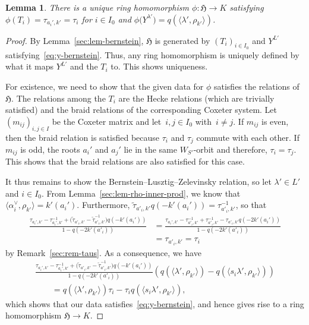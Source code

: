 \documentclass[pdftex]{sigma}
\newtheorem{Lemma}[Theorem]{Lemma}
\theoremstyle{definition}
\numberwithin{equation}{section}
\begin{document}
\begin{Lemma}\label{sec:lem-trivial-character}
 There is a unique ring homomorphism $\phi\colon \mathfrak{H}\to K$ satisfying
 $\phi(T_i) = \tau_{a_i',k'}=\tau_i$ for $i\in I_0$ and
$
 \phi\bigl(Y^{\lambda'}\bigr) = q(\langle \lambda', \rho_{k'}\rangle)$.
\end{Lemma}
\begin{proof}
 By Lemma~\ref{sec:lem-bernstein}, $\mathfrak{H}$ is generated by $(T_i)_{i\in I_0}$ and $Y^{L'}$ satisfying~\eqref{eq:y-bernstein}.
 Thus, any ring homomorphism is uniquely defined by what it maps $Y^{L'}$ and the $T_i$ to. This shows uniqueness.

 For existence, we need to show that the given data for $\phi$
 satisfies the relations of $\mathfrak{H}$. The relations
 among the $T_i$ are the Hecke relations (which are trivially satisfied) and the braid relations of the corresponding Coxeter
 system. Let $(m_{ij})_{i,j\in I}$ be the Coxeter matrix and let~${i,j\in I_0}$ with~${i\ne j}$. If $m_{ij}$ is even, then the
 braid relation is satisfied because $\tau_i$ and $\tau_j$ commute with each other. If $m_{ij}$ is odd, the
 roots $a_i'$ and $a_j'$ lie in the same $W_{S'}$-orbit and therefore,
 $\tau_i=\tau_j$. This shows that the braid relations
 are also satisfied for this case.

 It thus remains to show the Bernstein--Lusztig--Zelevinsky relation, so let $\lambda'\in L'$
 and $i\in I_0$. From Lemma~\ref{sec:lem-rho-inner-prod}, we know
 that $\langle\alpha_i^\vee,\rho_{k'}\rangle=k'(a_i')$. Furthermore,
 $\tilde{\tau}_{a'_i,k'}q(-k'(a_i'))=\tau_{a'_i,k'}^{-1}$, so that
 \begin{align*}
 \frac{\tau_{a_i',k'} - \tau_{a_i',k'}^{-1} + \bigl(\tilde{\tau}_{a'_i,k'} - \tilde{\tau}_{a'_i,k'}^{-1}\bigr)q(-k'(a_i'))}{1-q(-2k'(a'_i))}
& = \frac{\tau_{a_i',k'} - \tau_{a'_i,k'}^{-1}
 + \tau_{a'_i,k'}^{-1} - \tau_{a'_i,k'}q(-2k'(a_i'))}{1-q(-2k'(a'_i))}\\
& = \tau_{a'_i, k'} = \tau_i
 \end{align*}
 by Remark~\ref{sec:rem-taus}.
 As a consequence, we have
 \begin{gather*}
 \frac{\tau_{a_i',k'} - \tau_{a_i',k'}^{-1} + \bigl(\tilde{\tau}_{a'_i,k'} - \tilde{\tau}_{a'_i,k'}^{-1}\bigr)q(-k'(a_i'))}{1-q(-2k'(a'_i))} (q(\langle\lambda',\rho_{k'}\rangle)-q(\langle s_i\lambda',\rho_{k'}\rangle))\\
\qquad = q(\langle\lambda',\rho_{k'}\rangle)\tau_i
 - \tau_iq(\langle s_i\lambda',\rho_{k'}\rangle),
 \end{gather*}
 which shows that our data satisfies~\eqref{eq:y-bernstein}, and hence gives rise to a ring homomorphism \linebreak $\mathfrak{H}\to K$.
\end{proof}
\end{document}

